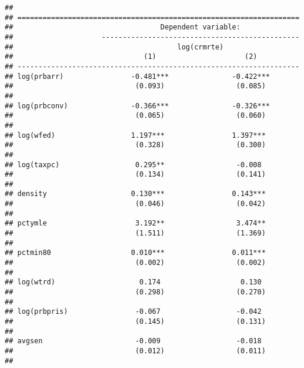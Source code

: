 \documentclass[]{article}
\begin{document}
\begin{verbatim}
## 
## ===================================================================
##                                   Dependent variable:              
##                     -----------------------------------------------
##                                       log(crmrte)                  
##                               (1)                     (2)          
## -------------------------------------------------------------------
## log(prbarr)                -0.481***               -0.422***       
##                             (0.093)                 (0.085)        
##                                                                    
## log(prbconv)               -0.366***               -0.326***       
##                             (0.065)                 (0.060)        
##                                                                    
## log(wfed)                  1.197***                1.397***        
##                             (0.328)                 (0.300)        
##                                                                    
## log(taxpc)                  0.295**                 -0.008         
##                             (0.134)                 (0.141)        
##                                                                    
## density                    0.130***                0.143***        
##                             (0.046)                 (0.042)        
##                                                                    
## pctymle                     3.192**                 3.474**        
##                             (1.511)                 (1.369)        
##                                                                    
## pctmin80                   0.010***                0.011***        
##                             (0.002)                 (0.002)        
##                                                                    
## log(wtrd)                    0.174                   0.130         
##                             (0.298)                 (0.270)        
##                                                                    
## log(prbpris)                -0.067                  -0.042         
##                             (0.145)                 (0.131)        
##                                                                    
## avgsen                      -0.009                  -0.018         
##                             (0.012)                 (0.011)        
##                                                                    

\end{verbatim}
\end{document}
